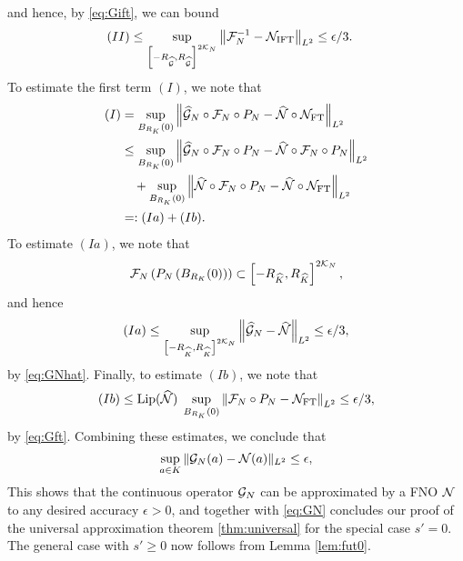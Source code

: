 \documentclass[reqno,a4paper]{amsart}
\begin{document}
and hence, by \eqref{eq:Gift}, we can bound
\begin{align*}
(II)
&\le
\sup_{\left[
-{R_{\widehat{\mathcal{G}}}}, {R_{\widehat{\mathcal{G}}}}
\right]^{2\mathcal{K}_N}}
\left\Vert 
\mathcal{F}_N^{-1} 
- 
\mathcal{N}_{\mathrm{IFT}}
\right\Vert_{L^2}
\le
\epsilon/3.
\end{align*}
To estimate the first term $(I)$, we note that 
\begin{align*}
(I) &=\sup_{B_{R_K}(0)} 
\left\Vert 
\widehat{\mathcal{G}}_N \circ \mathcal{F}_N \circ P_N
- 
\widehat{\mathcal{N}} \circ \mathcal{N}_{\mathrm{FT}}
\right\Vert_{L^2}
\\
&\le 
\sup_{B_{R_K}(0)} 
\left\Vert 
\widehat{\mathcal{G}}_N \circ \mathcal{F}_N \circ P_N
- 
\widehat{\mathcal{N}} \circ \mathcal{F}_N \circ P_N
\right\Vert_{L^2}
\\
&\quad 
+ 
\sup_{B_{R_K}(0)} 
\left\Vert 
\widehat{\mathcal{N}} \circ \mathcal{F}_N \circ P_N
- 
\widehat{\mathcal{N}} \circ \mathcal{N}_{\mathrm{FT}}
\right\Vert_{L^2}
\\
&=: (Ia) + (Ib).
\end{align*}
To estimate $(Ia)$, we note that 
\[
\mathcal{F}_N \left( P_N\left( B_{R_K}(0) \right) \right)
\subset 
\left[
-R_{\widehat{K}}, R_{\widehat{K}}
\right]^{2\mathcal{K}_N}, 
\]
and hence 
\[
(Ia) \le
\sup_{\left[
-R_{\widehat{K}}, R_{\widehat{K}}
\right]^{2\mathcal{K}_N}
}
\left\Vert 
\widehat{\mathcal{G}}_N
- 
\widehat{\mathcal{N}}
\right\Vert_{L^2}
\le \epsilon/3,
\]
by \eqref{eq:GNhat}. Finally, to estimate $(Ib)$, we note that 
\[
(Ib)
\le
\mathrm{Lip}(\widehat{\mathcal{N}}) 
\;
\sup_{B_{R_K}(0)} 
\left\Vert 
\mathcal{F}_N \circ P_N
- 
\mathcal{N}_{\mathrm{FT}}
\right\Vert_{L^2}
\le 
\epsilon/3,
\]
by \eqref{eq:Gft}. Combining these estimates, we conclude that 
\[
\sup_{a\in K} \Vert \mathcal{G}_N(a) - \mathcal{N}(a) \Vert_{L^2} \le \epsilon,
\]
This shows that the continuous operator $\mathcal{G}_N$ can be approximated by a FNO $\mathcal{N}$ to any desired accuracy $\epsilon> 0$, and together with \eqref{eq:GN} concludes our proof of the universal approximation theorem \ref{thm:universal} for the special case $s'=0$. The general case with $s'\ge 0$ now follows from Lemma \ref{lem:fut0}.
\end{document}
